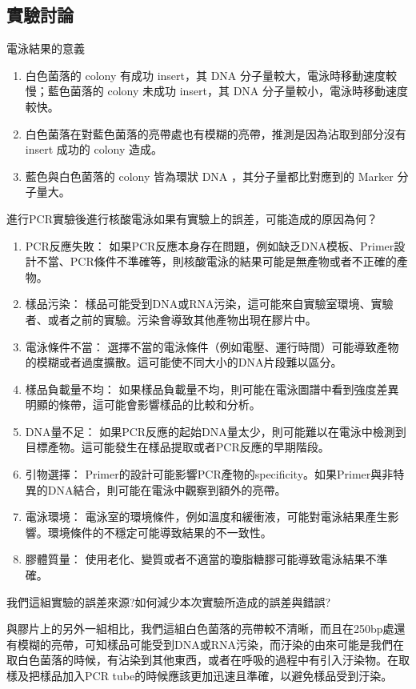 \subsection*{實驗討論}


\dsc 電泳結果的意義 
\begin{enumerate}[label=\arabic*.]
  \item 白色菌落的 colony 有成功 insert，其 DNA 分子量較大，電泳時移動速度較慢；藍色菌落的 colony 未成功 insert，其 DNA 分子量較小，電泳時移動速度較快。
  \item 白色菌落在對藍色菌落的亮帶處也有模糊的亮帶，推測是因為沾取到部分沒有 insert 成功的 colony 造成。
  \item 藍色與白色菌落的 colony 皆為環狀 DNA ，其分子量都比對應到的 Marker 分子量大。

\end{enumerate}


\dsc 進行PCR實驗後進行核酸電泳如果有實驗上的誤差，可能造成的原因為何？

\begin{enumerate}[label=\arabic*.]
  \item PCR反應失敗： 如果PCR反應本身存在問題，例如缺乏DNA模板、Primer設計不當、PCR條件不準確等，則核酸電泳的結果可能是無產物或者不正確的產物。\
  \item 樣品污染： 樣品可能受到DNA或RNA污染，這可能來自實驗室環境、實驗者、或者之前的實驗。污染會導致其他產物出現在膠片中。
  \item 電泳條件不當： 選擇不當的電泳條件（例如電壓、運行時間）可能導致產物的模糊或者過度擴散。這可能使不同大小的DNA片段難以區分。
  \item 樣品負載量不均： 如果樣品負載量不均，則可能在電泳圖譜中看到強度差異明顯的條帶，這可能會影響樣品的比較和分析。
  \item DNA量不足： 如果PCR反應的起始DNA量太少，則可能難以在電泳中檢測到目標產物。這可能發生在樣品提取或者PCR反應的早期階段。
  \item 引物選擇： Primer的設計可能影響PCR產物的specificity。如果Primer與非特異的DNA結合，則可能在電泳中觀察到額外的亮帶。
  \item 電泳環境： 電泳室的環境條件，例如溫度和緩衝液，可能對電泳結果產生影響。環境條件的不穩定可能導致結果的不一致性。
  \item 膠體質量： 使用老化、變質或者不適當的瓊脂糖膠可能導致電泳結果不準確。
\end{enumerate}


\dsc 我們這組實驗的誤差來源?如何減少本次實驗所造成的誤差與錯誤?

與膠片上的另外一組相比，我們這組白色菌落的亮帶較不清晰，而且在250bp處還有模糊的亮帶，可知樣品可能受到DNA或RNA污染，而汙染的由來可能是我們在取白色菌落的時候，有沾染到其他東西，或者在呼吸的過程中有引入汙染物。在取樣及把樣品加入PCR tube的時候應該更加迅速且準確，以避免樣品受到汙染。

